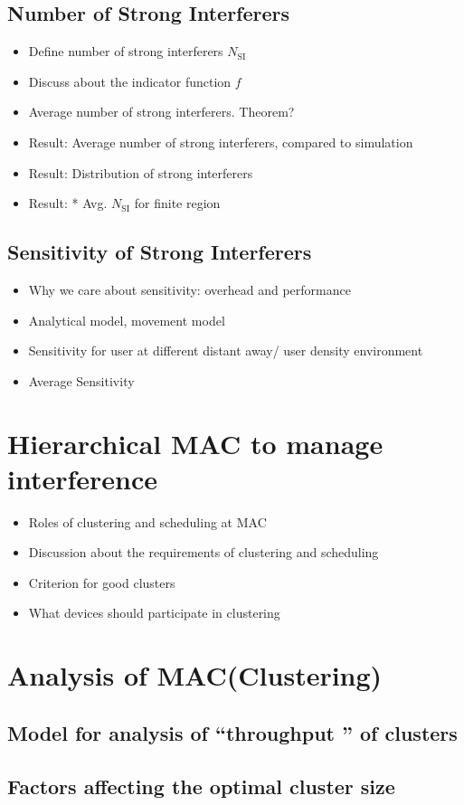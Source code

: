 \documentclass[10pt, conference, letterpaper]{IEEEtran}
\begin{document}
\subsection{Number of Strong Interferers}
\begin{itemize}
\item Define number of strong interferers $N_{\text{SI}}$
\item Discuss about the indicator function $f$
\item Average number of strong interferers. Theorem? 
\item Result: Average number of strong interferers, compared to simulation
\item Result: Distribution of strong interferers
\item Result: * Avg. $N_{\text{SI}}$ for finite region
\end{itemize}
\subsection{Sensitivity of Strong Interferers}
\begin{itemize}
\item Why we care about sensitivity: overhead and performance
\item Analytical model, movement model
\item Sensitivity for user at different distant away/ user density environment
\item Average Sensitivity
\end{itemize}

\section{Hierarchical MAC to manage interference}
\begin{itemize}
\item Roles of clustering and scheduling at MAC
\item Discussion about the requirements of clustering and scheduling
\item Criterion for good clusters
\item What devices should participate in clustering
\end{itemize}

\section{Analysis of MAC(Clustering)}
\subsection{Model for analysis of ``throughput '' of clusters}
\subsection{Factors affecting the optimal cluster size}
\end{document}
